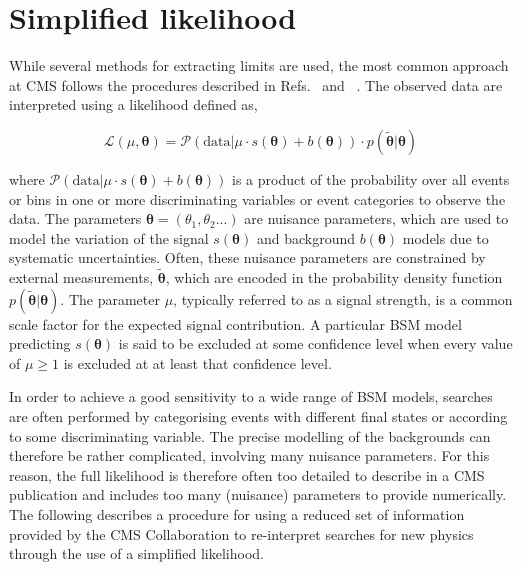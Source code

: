 \section{Simplified likelihood}
\label{sec:simplified-likelihood}

While several methods for extracting 
limits are used, the most common approach at CMS follows the procedures  
described in Refs.~\cite{Chatrchyan:2012tx} and ~\cite{CMS-NOTE-2011-005}. 
The observed data are interpreted using a likelihood defined as,

\begin{equation}
 \mathcal{L}(\mu, \boldsymbol{\theta}) = 
 \mathcal{P}(\mathrm{data}|\mu\cdot s(\boldsymbol{\theta}) + b(\boldsymbol{\theta})) \cdot p(\tilde{\boldsymbol{\theta}}|\boldsymbol{\theta})
\label{eq:generic-likelihood}
\end{equation}

where $\mathcal{P}(\mathrm{data}|\mu\cdot s(\boldsymbol{\theta}) + b(\boldsymbol{\theta}))$ is a product of the probability 
over all events or bins in one or more discriminating variables or event categories to observe the data. The parameters 
$\boldsymbol{\theta}=\left(\theta_{1},\theta_{2}...\right)$ are nuisance parameters, which are used to model the variation of the 
signal $s(\boldsymbol{\theta})$ and background $b(\boldsymbol{\theta})$ models due to systematic uncertainties. Often, these nuisance 
parameters are constrained by external measurements, $\tilde{\boldsymbol{\theta}}$, which are encoded in the 
probability density function $p(\tilde{\boldsymbol{\theta}}|\boldsymbol{\theta})$. 
The parameter $\mu$, typically referred to as a signal strength, is a common scale factor for the expected signal contribution. 
A particular BSM model predicting $s(\boldsymbol{\theta})$ is said to be excluded at some confidence level 
when every value of $\mu\ge1$ is excluded at at least that confidence level.

In order to achieve a good sensitivity to a wide range of BSM models, searches are often performed 
by categorising events with different final states or according to some discriminating variable. 
The precise modelling of the backgrounds can therefore be rather complicated, involving many 
nuisance parameters. For this reason, the full likelihood is therefore often 
too detailed to describe in a CMS publication and includes too many (nuisance) parameters to provide numerically. 
The following describes a procedure for using a reduced set of information provided by the CMS Collaboration to 
re-interpret searches for new physics through the use of a simplified likelihood. 


